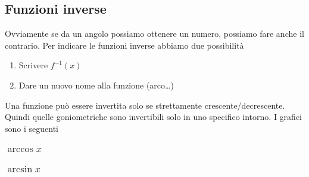 \subsection{Funzioni inverse}
Ovviamente se da un angolo possiamo ottenere un numero, possiamo fare anche il contrario. Per indicare
le funzioni inverse abbiamo due possibilità
\begin{enumerate}
  \item Scrivere $f^{-1}(x)$
  \item Dare un nuovo nome alla funzione (arco\ldots)
\end{enumerate}
Una funzione può essere invertita solo se strettamente crescente/decrescente. Quindi quelle 
goniometriche sono invertibili solo in uno specifico intorno.
I grafici sono i seguenti
\subsubsection{$\arccos x$}
\begin{center}
\end{center}
\subsubsection{$\arcsin x$}
\begin{center}
\end{center}

